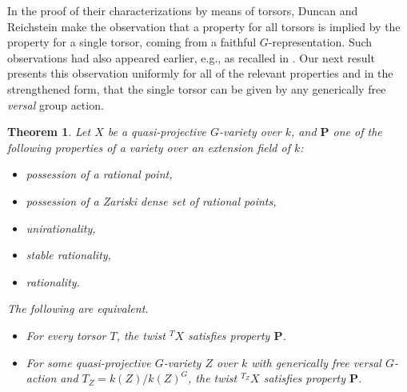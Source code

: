 \documentclass[10pt,a4paper]{amsart}
\numberwithin{equation}{section}
\newtheorem{theo}[prop]{Theorem}
\begin{document}
In the proof of their characterizations by means of torsors, Duncan and Reichstein make the observation that a property for all torsors is implied by the property for a single torsor, coming from a faithful $G$-representation.
Such observations had also appeared earlier, e.g., as recalled in \cite[Prop.\ 2.1]{GM}.
Our next result presents this observation uniformly for all of the relevant properties and in the strengthened form, that the single torsor can be given by any generically free \emph{versal} group action.


\begin{theo}
\label{thm.onetorsorP}
Let $X$ be a quasi-projective $G$-variety over $k$, and
$\mathbf{P}$ one of the following properties of a variety over an extension field of $k$: 
\begin{itemize}
    \item possession of a rational point,
\item possession of a Zariski dense set of rational points,
\item unirationality,
\item stable rationality,
\item rationality.
\end{itemize}
The following are equivalent.
\begin{itemize}
\item[(i)] For every torsor $T$, the twist
${}^TX$ satisfies property $\mathbf{P}$.
\item[(ii)] For some quasi-projective $G$-variety $Z$ over $k$ with generically free versal $G$-action and 
$T_Z=k(Z)/k(Z)^G$, 
the twist ${}^{T_Z}X$ 
satisfies property $\mathbf{P}$.
\end{itemize}
\end{theo}
\end{document}
